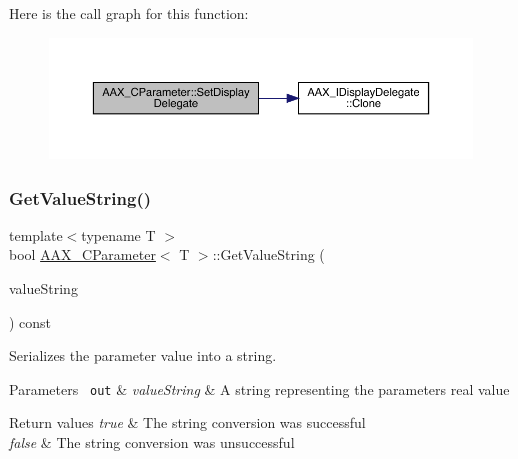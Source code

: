 Here is the call graph for this function\+:
\nopagebreak
\begin{figure}[H]
\begin{center}
\leavevmode
\includegraphics[width=350pt]{a01537_a75619ec0a487c28966dc5448e4d2ab05_cgraph}
\end{center}
\end{figure}
\mbox{\label{a01537_ae1dddbaf06ec0851dbf4eb09bad5b24f}} 
\subsubsection{\texorpdfstring{GetValueString()}{GetValueString()}\hspace{0.1cm}{\footnotesize\ttfamily [1/2]}}
{\footnotesize\ttfamily template$<$typename T $>$ \\
bool \mbox{\hyperlink{a01537}{A\+A\+X\+\_\+\+C\+Parameter}}$<$ T $>$\+::Get\+Value\+String (\begin{DoxyParamCaption}\item[{\mbox{\hyperlink{a01573}{A\+A\+X\+\_\+\+C\+String}} $\ast$}]{value\+String }\end{DoxyParamCaption}) const\hspace{0.3cm}{\ttfamily [virtual]}}



Serializes the parameter value into a string. 


\begin{DoxyParams}[1]{Parameters}
\mbox{\texttt{ out}}  & {\em value\+String} & A string representing the parameter\textquotesingle{}s real value\\
\hline
\end{DoxyParams}

\begin{DoxyRetVals}{Return values}
{\em true} & The string conversion was successful \\
\hline
{\em false} & The string conversion was unsuccessful \\
\hline
\end{DoxyRetVals}


